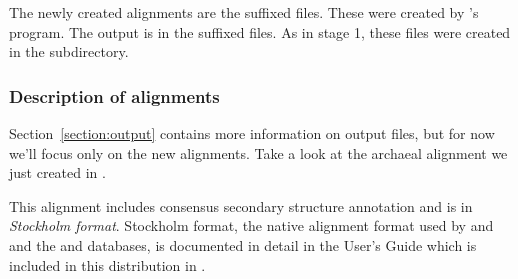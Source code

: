 The newly created alignments are the  suffixed files. These
were created by 's  program. The
 output is in the  suffixed files.  As in
stage 1, these files were created in the 
subdirectory. 

\subsubsection{Description of alignments}

Section~\ref{section:output} contains more information
on  output files, but for now we'll focus only on the new
alignments.  Take a look at the archaeal alignment we just created in
.

This alignment includes consensus secondary structure annotation and
is in \emph{Stockholm format}. 
Stockholm format, the native alignment format used by  and
 and the  and 
databases, is documented in detail in the  User's
Guide which is included in this distribution in
.

